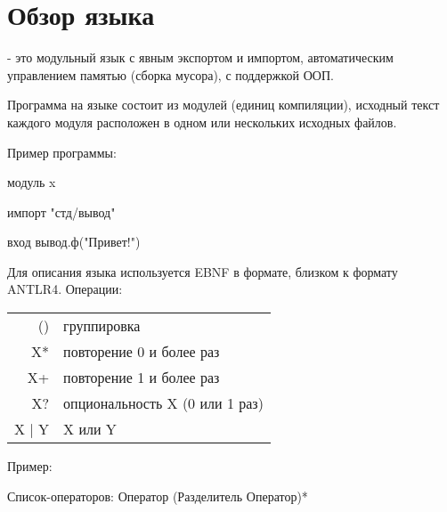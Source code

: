 \hypertarget{review}{%
\section{Обзор языка}\label{review:chapter}}

\thelang{} - это модульный язык с явным экспортом и импортом, автоматическим управлением памятью (сборка мусора), с поддержкой ООП.

Программа на языке \thelang{} состоит из модулей (единиц компиляции), исходный текст каждого модуля расположен в одном или нескольких исходных файлов.

Пример программы:
\begin{Trivil}
модуль x

импорт "стд/вывод"

вход { 
    вывод.ф("Привет!\n")
}
\end{Trivil}

Для описания языка используется EBNF в формате, близком к формату ANTLR4. Операции: 

\begin{tabular}[c]{r|l}
    () & группировка \\
    X* & повторение 0 и более раз \\
    X+ & повторение 1 и более раз \\
    X? & опциональность X (0 или 1 раз) \\
    X | Y & X или Y \\
\end{tabular}

\bigskip
Пример:
\begin{Grammar}[vspace=0pt]
Список-операторов: Оператор (Разделитель Оператор)* 
\end{Grammar}

